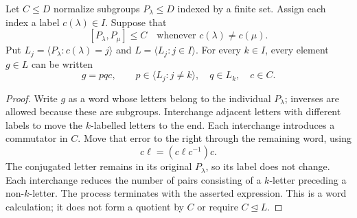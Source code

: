 \begin{lemma}
\label{glue:collection}
Let $C\le D$ normalize subgroups $P_\lambda\le D$ indexed by a finite
set.  Assign each index a label $c(\lambda)\in I$.  Suppose that
\[
 [P_\lambda,P_\mu]\le C
                \quad\text{whenever }c(\lambda)\ne c(\mu).
\]
Put $L_j=\langle P_\lambda:c(\lambda)=j\rangle$ and
$L=\langle L_j:j\in I\rangle$.  For every $k\in I$, every element
$g\in L$ can be written
\[
        g=pqc,\qquad
        p\in\langle L_j:j\ne k\rangle,\quad q\in L_k,\quad c\in C.
\]
\end{lemma}
\begin{proof}
Write $g$ as a word whose letters belong to the individual
$P_\lambda$; inverses are allowed because these are subgroups.
Interchange adjacent letters with different labels to move the
$k$-labelled letters to the end.  Each interchange introduces a
commutator in $C$.  Move that error to the right through the remaining
word, using
\[
                    c\ell=(c\ell c^{-1})c.
\]
The conjugated letter remains in its original $P_\lambda$, so its
label does not change.  Each interchange reduces the number of pairs
consisting of a $k$-letter preceding a non-$k$-letter.  The process
terminates with the asserted expression.  This is a word calculation;
it does not form a quotient by $C$ or require $C\trianglelefteq L$.
\end{proof}

